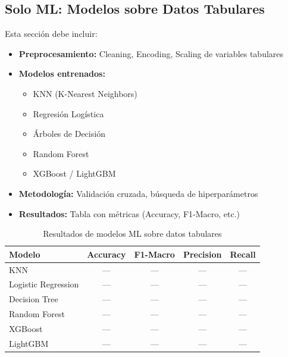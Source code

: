 \documentclass[12pt,a4paper]{article}
\begin{document}
\subsection{Solo ML: Modelos sobre Datos Tabulares}

\begin{pendiente}
Esta sección debe incluir:
\begin{itemize}
    \item \textbf{Preprocesamiento:} Cleaning, Encoding, Scaling de variables tabulares
    \item \textbf{Modelos entrenados:}
    \begin{itemize}
        \item KNN (K-Nearest Neighbors)
        \item Regresión Logística
        \item Árboles de Decisión
        \item Random Forest
        \item XGBoost / LightGBM
    \end{itemize}
    \item \textbf{Metodología:} Validación cruzada, búsqueda de hiperparámetros
    \item \textbf{Resultados:} Tabla con métricas (Accuracy, F1-Macro, etc.)
\end{itemize}
\end{pendiente}

\begin{table}[H]
\centering
\begin{tabular}{lcccc}
\toprule
\textbf{Modelo} & \textbf{Accuracy} & \textbf{F1-Macro} & \textbf{Precision} & \textbf{Recall} \\
\midrule
KNN & --- & --- & --- & --- \\
Logistic Regression & --- & --- & --- & --- \\
Decision Tree & --- & --- & --- & --- \\
Random Forest & --- & --- & --- & --- \\
XGBoost & --- & --- & --- & --- \\
LightGBM & --- & --- & --- & --- \\
\bottomrule
\end{tabular}
\caption{Resultados de modelos ML sobre datos tabulares}
\label{tab:resultados_ml}
\end{table}
\end{document}
